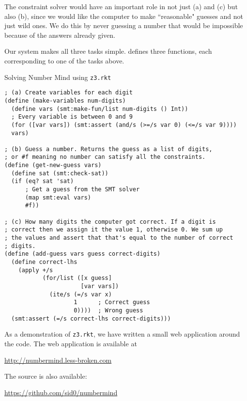 The constraint solver would have an important role in not just (a) and (c) but
also (b), since we would like the computer to make ``reasonable" guesses and
not just wild ones. We do this by never guessing a number that would be
impossible because of the answers already given.

Our system makes all three tasks simple.  defines three
functions, each corresponding to one of the tasks above.

\begin{program}
\caption{Solving Number Mind using \texttt{z3.rkt}}
\label{fig:numbermind}
\begin{verbatim}
; (a) Create variables for each digit
(define (make-variables num-digits)
  (define vars (smt:make-fun/list num-digits () Int))
  ; Every variable is between 0 and 9
  (for ([var vars]) (smt:assert (and/s (>=/s var 0) (<=/s var 9))))
  vars)

; (b) Guess a number. Returns the guess as a list of digits,
; or #f meaning no number can satisfy all the constraints.
(define (get-new-guess vars)
  (define sat (smt:check-sat))
  (if (eq? sat 'sat)
      ; Get a guess from the SMT solver
      (map smt:eval vars)
      #f))

; (c) How many digits the computer got correct. If a digit is
; correct then we assign it the value 1, otherwise 0. We sum up
; the values and assert that that's equal to the number of correct
; digits.
(define (add-guess vars guess correct-digits)
  (define correct-lhs
    (apply +/s
           (for/list ([x guess]
                      [var vars])
             (ite/s (=/s var x)
                    1      ; Correct guess
                    0))))  ; Wrong guess
  (smt:assert (=/s correct-lhs correct-digits)))
\end{verbatim}
\end{program}

As a demonstration of \texttt{z3.rkt}, we have written a small web application
around the code. The web application is available at

\begin{center}
\url{http://numbermind.less-broken.com}
\end{center}

The source is also available:

\begin{center}
\url{https://github.com/sid0/numbermind}
\end{center}
